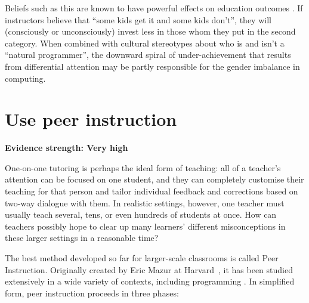 \documentclass[10pt,letterpaper]{article}
\newcommand{\rulemajor}[2]{\section{#1}\label{#2}}
\newcommand{\evidence}[1]{\vspace{-0.3cm}\textbf{Evidence strength: #1}\vspace{0.5cm}}
\begin{document}
Beliefs such as this are known to have powerful effects on education outcomes
\cite{alvidrez-weinstein,brophy,jussim-eccles}.
If instructors believe that ``some kids get it and some kids don't'',
they will (consciously or unconsciously) invest less in those whom they put in the second category.
When combined with cultural stereotypes about who is and isn't a ``natural programmer'',
the downward spiral of under-achievement that results from differential attention
may be partly responsible for the gender imbalance in computing.

\rulemajor{Use peer instruction}{peer-instruction}
\evidence{Very high}

One-on-one tutoring is perhaps the ideal form of teaching:
all of a teacher's attention can be focused on one student,
and they can completely customise their teaching for that person
and tailor individual feedback and corrections based on two-way dialogue with them.
In realistic settings,
however,
one teacher must usually teach several, tens, or even hundreds of students at once.
How can teachers possibly hope to clear up many learners' different misconceptions
in these larger settings in a reasonable time?

The best method developed so far for larger-scale classrooms is called Peer Instruction.
Originally created by Eric Mazur at Harvard~\cite{mazur-peer-instruction},
it has been studied extensively in a wide variety of contexts,
including programming \cite{porter-multi,porter-success}.
In simplified form,
peer instruction proceeds in three phases:
\end{document}
